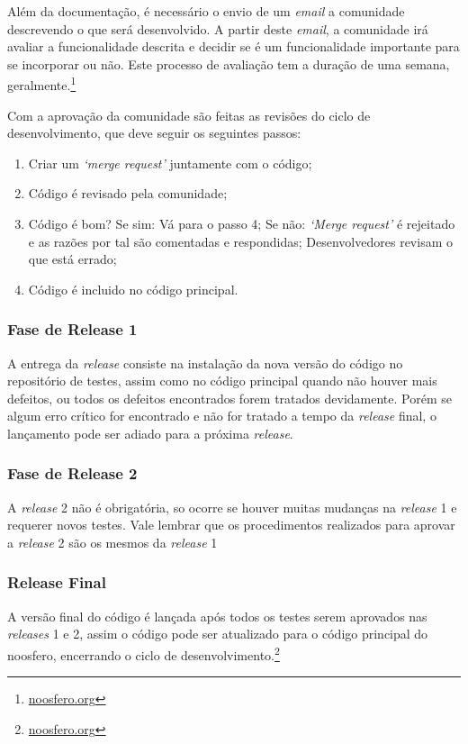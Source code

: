 
Além da documentação, é necessário o envio de um \textit{email} a comunidade descrevendo o 
que será desenvolvido. A partir deste \textit{email}, a comunidade irá avaliar a funcionalidade 
descrita e decidir se é um funcionalidade importante para se incorporar ou não. 
Este processo de avaliação tem a duração de uma semana, geralmente.\footnote{\url{noosfero.org}}

Com a aprovação da comunidade são feitas as revisões do ciclo de desenvolvimento, 
que deve seguir os seguintes passos:
%
\begin{enumerate}
\item Criar um \textit{‘merge request’} juntamente com o código;
\item Código é revisado pela comunidade;
\item Código é bom? 
\subitem Se sim:
\subsubitem Vá para o passo 4;
\subitem Se não:
\subsubitem \textit{‘Merge request’} é rejeitado e as razões por tal são comentadas e 
respondidas;
\subsubitem Desenvolvedores revisam o que está errado;
\item Código é incluido no código principal.
\end{enumerate}
\subsubsection{Fase de Release 1}
%
A entrega da \textit{release} consiste na instalação da nova versão do código no repositório de testes, assim como no código principal quando não houver mais defeitos, ou todos os defeitos encontrados forem tratados devidamente. Porém se algum erro crítico for encontrado e não for tratado a tempo da \textit{release} final, o lançamento pode ser adiado para a próxima \textit{release}.
%
\subsubsection{Fase de Release 2}
%
A \textit{release} 2 não é obrigatória, so ocorre se houver muitas mudanças na \textit{release} 1 e requerer novos testes. Vale lembrar que os procedimentos realizados para aprovar a \textit{release} 2 são os mesmos da \textit{release} 1%
%
\subsubsection{Release Final}
%
A versão final do código é lançada após todos os testes serem aprovados nas \textit{releases} 1 e 2, assim o código pode ser atualizado para o código principal do noosfero, encerrando o ciclo de desenvolvimento.\footnote{\url{noosfero.org}}

